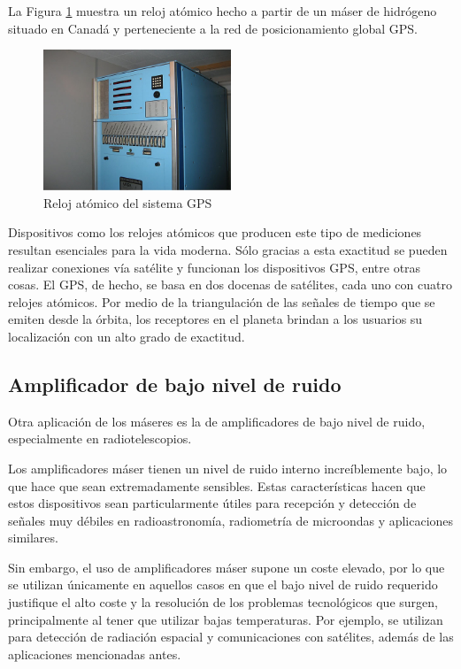 La Figura \ref{fig:atomic_clock_gps} muestra un reloj at\'omico hecho a partir de un m\'aser de hidr\'ogeno situado en Canad\'a y perteneciente a la red de posicionamiento global GPS.

\begin{figure}[ht!!]
 \centering
 \includegraphics[width=0.5\textwidth]{./Utils/atomic_clock_gps.jpg}
 \caption{Reloj atómico del sistema GPS}
 \label{fig:atomic_clock_gps}
\end{figure}


Dispositivos como los relojes at\'omicos que producen este tipo de mediciones resultan esenciales para la vida moderna. S\'olo gracias a esta exactitud se pueden realizar conexiones v\'ia sat\'elite y funcionan los dispositivos GPS, entre otras cosas. El GPS, de hecho, se basa en dos docenas de satélites, cada uno con cuatro relojes atómicos. Por medio de la triangulación de las señales de tiempo que se emiten desde la órbita, los receptores en el planeta brindan a los usuarios su localización con un alto grado de exactitud.

\subsection{Amplificador de bajo nivel de ruido}

Otra aplicaci\'on de los m\'aseres es la de amplificadores de bajo nivel de ruido, especialmente en radiotelescopios.

Los amplificadores m\'aser tienen un nivel de ruido interno incre\'iblemente bajo, lo que hace que sean extremadamente sensibles. Estas caracter\'isticas hacen que estos dispositivos sean particularmente \'utiles para recepci\'on y detecci\'on de se\~nales muy d\'ebiles en radioastronom\'ia, radiometr\'ia de microondas y aplicaciones similares.

Sin embargo, el uso de amplificadores m\'aser supone un coste elevado, por lo que se utilizan \'unicamente en aquellos casos en que el bajo nivel de ruido requerido justifique el alto coste y la resoluci\'on de los problemas tecnol\'ogicos que surgen, principalmente al tener que utilizar bajas temperaturas. Por ejemplo, se utilizan para detecci\'on de radiaci\'on espacial y comunicaciones con sat\'elites, adem\'as de las aplicaciones mencionadas antes.

